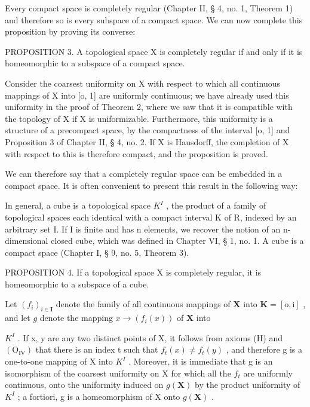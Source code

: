 Every compact space is completely regular (Chapter II, § 4, no. 1, Theorem 1) and therefore so is every subspace of a compact space. We can now complete this proposition by proving its converse:

PROPOSITION 3. A topological space X is completely regular if and only if it is homeomorphic to a subspace of a compact space.

Consider the coarsest uniformity on X with respect to which all continuous mappings of X into {[}o, 1{]} are uniformly continuous; we have already used this uniformity in the proof of Theorem 2, where we saw that it is compatible with the topology of X if X is uniformizable. Furthermore, this uniformity is a structure of a precompact space, by the compactness of the interval {[}o, 1{]} and Proposition 3 of Chapter II, § 4, no. 2. If X is Hausdorff, the completion of X with respect to this is therefore compact, and the proposition is proved.

We can therefore say that a completely regular space can be embedded in a compact space. It is often convenient to present this result in the following way:

In general, a cube is a topological space \(K^{I}\) , the product of a family of topological spaces each identical with a compact interval K of R, indexed by an arbitrary set I. If I is finite and has n elements, we recover the notion of an n-dimensional closed cube, which was defined in Chapter VI, § 1, no. 1. A cube is a compact space (Chapter I, § 9, no. 5, Theorem 3).

PROPOSITION 4. If a topological space X is completely regular, it is homeomorphic to a subspace of a cube.

Let \((f_{i})_{i\in \mathbf{I}}\) denote the family of all continuous mappings of \(\mathbf{X}\) into \(\mathbf{K} = [\mathrm{o},\mathrm{i}]\) , and let \(g\) denote the mapping \(x\to (f_i(x))\) of \(\mathbf{X}\) into

\(K^{I}\) . If x, y are any two distinct points of X, it follows from axioms (H) and \((\mathrm{O}_{\mathrm{IV}})\) that there is an index t such that \(f_{t}(x) \neq f_{t}(y)\) , and therefore g is a one-to-one mapping of X into \(K^{I}\) . Moreover, it is immediate that g is an isomorphism of the coarsest uniformity on X for which all the \(f_{t}\) are uniformly continuous, onto the uniformity induced on \(g(\mathbf{X})\) by the product uniformity of \(K^{I}\) ; a fortiori, g is a homeomorphism of X onto \(g(\mathbf{X})\) .

